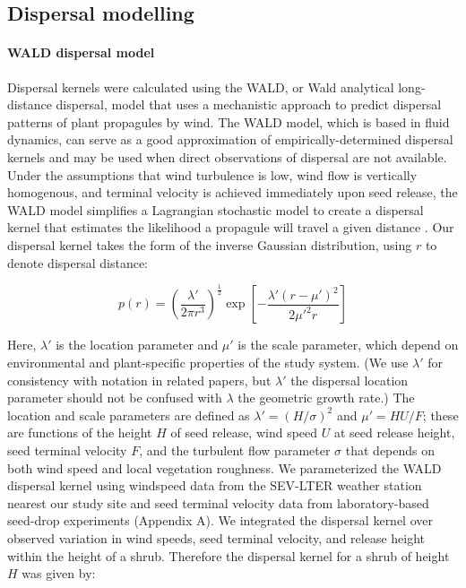 \documentclass[11pt]{article}\usepackage[]{graphicx}\usepackage[usenames,dvipsnames]{xcolor}
\begin{document}
\subsection*{Dispersal modelling}
\paragraph{WALD dispersal model}
Dispersal kernels were calculated using the WALD, or Wald analytical long-distance dispersal, model that uses a mechanistic approach to predict dispersal patterns of plant propagules by wind.
The WALD model, which is based in fluid dynamics, can serve as a good approximation of empirically-determined dispersal kernels \citep{katul2005mechanistic, skarpaas2007dispersal} and may be used when direct observations of dispersal are not available. 
Under the assumptions that wind turbulence is low, wind flow is vertically homogenous, and terminal velocity is achieved immediately upon seed release, the WALD model simplifies a Lagrangian stochastic model to create a dispersal kernel that estimates the likelihood a propagule will travel a given distance \citep{katul2005mechanistic}.
Our dispersal kernel takes the form of the inverse Gaussian distribution, using $r$ to denote dispersal distance:

\begin{linenomath*} \begin{equation} p(r) = \left(\frac{\lambda'}{2 \pi r^3}\right)^\frac{1}{2} \exp\left[-\frac{\lambda'(r - \mu')^2}{2 \mu'^2 r}\right] \end{equation} \end{linenomath*} 

Here, $\lambda'$ is the location parameter and $\mu'$ is the scale parameter, which depend on environmental and plant-specific properties of the study system. 
(We use $\lambda'$ for consistency with notation in related papers, but $\lambda'$ the dispersal location parameter should not be confused with $\lambda$ the geometric growth rate.)
The location and scale parameters are defined as $\lambda' = (H/\sigma)^2$ and $\mu' = HU/F$; these are functions of the height $H$ of seed release, wind speed $U$ at seed release height, seed terminal velocity $F$, and the turbulent flow parameter $\sigma$ that depends on both wind speed and local vegetation roughness. 
We parameterized the WALD dispersal kernel using windspeed data from the SEV-LTER weather station nearest our study site \citep{SEVmet} and seed terminal velocity data from laboratory-based seed-drop experiments (Appendix A). 
We integrated the dispersal kernel over observed variation in wind speeds, seed terminal velocity, and release height within the height of a shrub.
Therefore the dispersal kernel for a shrub of height $H$ was given by:
\end{document}
